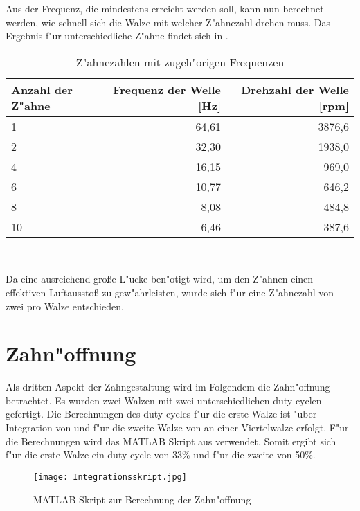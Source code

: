 Aus der Frequenz, die mindestens erreicht werden soll, kann nun berechnet werden, wie schnell sich die Walze mit welcher Z"ahnezahl drehen muss. Das Ergebnis f"ur unterschiedliche Z"ahne findet sich in .\\
\begin{table}[h]
	\centering
	\begin{tabular}{lrr}
		\toprule
		Anzahl der Z"ahne & Frequenz der Welle [Hz] & Drehzahl der Welle [rpm]\\
		\midrule
		1 & 64,61 & 3876,6\\
		2 & 32,30 & 1938,0\\
		4 & 16,15 & 969,0\\
		6 & 10,77 & 646,2\\
		8 & 8,08 & 484,8\\
		10 & 6,46 & 387,6\\
		\bottomrule
	\end{tabular}\\
	\caption{Z"ahnezahlen mit zugeh"origen Frequenzen}
	\label{tab:zahnezahl}
\end{table}

Da eine ausreichend gro\ss{}e L"ucke ben"otigt wird, um den Z"ahnen einen effektiven Luftaussto\ss{} zu gew"ahrleisten, wurde sich f"ur eine Z"ahnezahl von zwei pro Walze entschieden.\\

\section{Zahn"offnung}
Als dritten Aspekt der Zahngestaltung wird im Folgendem die Zahn"offnung betrachtet. Es wurden zwei Walzen mit zwei unterschiedlichen duty cyclen gefertigt. Die Berechnungen des duty cycles f"ur die erste Walze ist "uber Integration von  und f"ur die zweite Walze von  an einer Viertelwalze erfolgt. F"ur die Berechnungen wird das MATLAB Skript aus  verwendet. Somit ergibt sich f"ur die erste Walze ein duty cycle von 33\% und f"ur die zweite von 50\%.
\begin{figure}[h]
	\centering
	\texttt{[image: Integrationsskript.jpg]}
	\caption{MATLAB Skript zur Berechnung der Zahn"offnung}
	\label{fig:Integrationsskript}
\end{figure}\\



